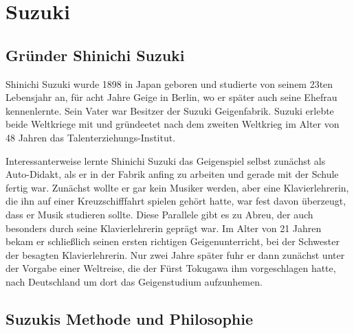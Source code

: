 \section{Suzuki}

\subsection{Gründer Shinichi Suzuki}
Shinichi Suzuki wurde 1898 in Japan geboren und studierte von seinem 23ten
Lebensjahr an, für acht Jahre Geige in Berlin, wo er später auch seine Ehefrau
kennenlernte. Sein Vater war Besitzer der Suzuki Geigenfabrik. Suzuki erlebte
beide Weltkriege mit und gründeetet nach dem zweiten Weltkrieg im Alter von 48
Jahren das Talenterziehungs-Institut. 

Interessanterweise lernte Shinichi Suzuki das Geigenspiel selbst zunächst als
Auto-Didakt, als er in der Fabrik anfing zu arbeiten und gerade mit der Schule
fertig war. Zunächst wollte er gar kein Musiker werden, aber eine
Klavierlehrerin, die ihn auf einer Kreuzschifffahrt spielen gehört hatte, war
fest davon überzeugt, dass er Musik studieren sollte.
\autocite[89]{suzuki:erziehung_ist_liebe} Diese Parallele gibt es zu Abreu, der
auch besonders durch seine Klavierlehrerin geprägt war. Im Alter von 21 Jahren
bekam er schließlich seinen ersten richtigen Geigenunterricht, bei der Schwester
der besagten Klavierlehrerin. Nur zwei Jahre später fuhr er dann zunächst unter
der Vorgabe einer Weltreise, die der Fürst Tokugawa ihm vorgeschlagen hatte,
nach Deutschland um dort das Geigenstudium aufzunhemen.
\autocite[90ff]{suzuki:erziehung_ist_liebe}

\subsection{Suzukis Methode und Philosophie}

